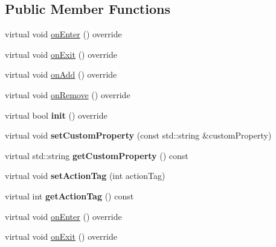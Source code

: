 \subsection*{Public Member Functions}
\begin{DoxyCompactItemize}
\item 
virtual void \hyperlink{classcocostudio_1_1ComExtensionData_a9e35ea46e5604e7e7c2f1e757bb5b890}{on\+Enter} () override
\item 
virtual void \hyperlink{classcocostudio_1_1ComExtensionData_a525d6cdee24910607cf7c5a1858937b3}{on\+Exit} () override
\item 
virtual void \hyperlink{classcocostudio_1_1ComExtensionData_a4af44abdaf01e9d61ed1018cc174454c}{on\+Add} () override
\item 
virtual void \hyperlink{classcocostudio_1_1ComExtensionData_a4d8def1a20d97edcca1534450941b66a}{on\+Remove} () override
\item 
\mbox{\label{classcocostudio_1_1ComExtensionData_a80fb12a73be6ffe68f6014238a575ee2}} 
virtual bool {\bfseries init} () override
\item 
\mbox{\label{classcocostudio_1_1ComExtensionData_a2a35c4e020fbc789020dbcbec4749c07}} 
virtual void {\bfseries set\+Custom\+Property} (const std\+::string \&custom\+Property)
\item 
\mbox{\label{classcocostudio_1_1ComExtensionData_a2d029b9b6e9ea18c610e2e9d37617e10}} 
virtual std\+::string {\bfseries get\+Custom\+Property} () const
\item 
\mbox{\label{classcocostudio_1_1ComExtensionData_acf5c90af54ff94bb659c821696790924}} 
virtual void {\bfseries set\+Action\+Tag} (int action\+Tag)
\item 
\mbox{\label{classcocostudio_1_1ComExtensionData_a265fc6abb8504c8460cd88cbee0f7f57}} 
virtual int {\bfseries get\+Action\+Tag} () const
\item 
virtual void \hyperlink{classcocostudio_1_1ComExtensionData_a15bbeb416b733b93bec9063cbdba4269}{on\+Enter} () override
\item 
virtual void \hyperlink{classcocostudio_1_1ComExtensionData_a8b84803fe15e13b3c674e4bcb82836dd}{on\+Exit} () override

\end{DoxyCompactItemize}
